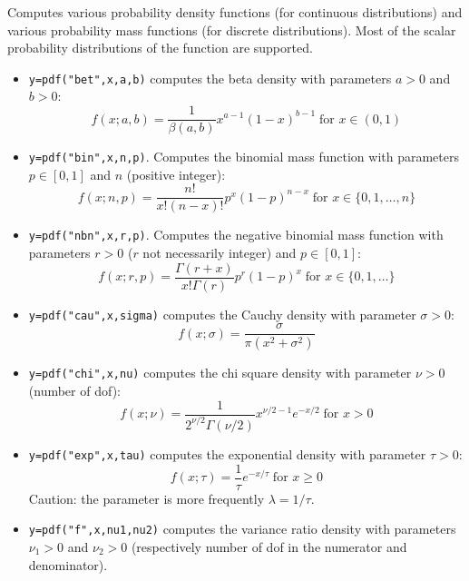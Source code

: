 \begin{mandescription}
  Computes various probability density functions (for continuous
  distributions) 
  and various probability mass functions (for discrete distributions). Most of the
  scalar probability distributions of the 
  function are supported. 
\begin{itemize}

\item {}  \verb!y=pdf("bet",x,a,b)! computes the beta
  density with parameters $a > 0$ and $b > 0$:
$$
     f(x; a, b) =
        \frac{1}{\beta(a,b)} x^{a-1}(1-x)^{b-1} \;
        \mbox{for } x \in (0,1)
$$

\item {} \verb!y=pdf("bin",x,n,p)!. Computes
  the binomial mass function with parameters $p \in [0,1]$ and $n$
  (positive integer):
$$
     f(x; n, p) = \frac{ n! }{ x! (n-x)!} p^x (1-p)^{n-x} \;\mbox{for } x \in \{0,1,\dots,n\}
$$

\item {} \verb!y=pdf("nbn",x,r,p)!. Computes
  the negative binomial mass function with parameters $r > 0$ ($r$ not
  necessarily integer) and $p \in [0,1]$:
$$
     f(x; r, p) = \frac{ \Gamma(r+x) }{ x! \Gamma(r)} p^r (1-p)^x \;\mbox{for } x \in \{0,1,\dots\}
$$


\item {} \verb!y=pdf("cau",x,sigma)! computes the Cauchy
  density with parameter $\sigma > 0$:
$$
     f(x; \sigma) = \frac{ \sigma }{ \pi ( x^2 + \sigma^2 ) }
$$


\item {} \verb!y=pdf("chi",x,nu)! computes the chi square
  density with parameter $\nu > 0$ (number of dof):
$$
     f(x; \nu) = \frac{1}{2^{\nu/2} \Gamma(\nu/2)} x^{\nu/2-1} e^{-x/2}\; \mbox{for } x > 0 
$$


\item {} \verb!y=pdf("exp",x,tau)! computes the exponential
  density with parameter $\tau > 0$:
$$
     f(x; \tau) = \frac{1}{\tau} e^{-x/\tau} \; \mbox{for } x
     \ge 0
$$
Caution: the parameter is more frequently $\lambda = 1/\tau$.


\item {} \verb!y=pdf("f",x,nu1,nu2)! computes
  the variance ratio density with parameters $\nu_1 > 0$ and $\nu_2 >
  0$ (respectively number of dof in the numerator and denominator).



\end{itemize}
\end{mandescription}
